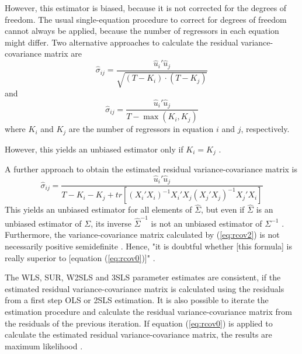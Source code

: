 \documentclass[article]{jss}
\begin{document}
However, this estimator is biased, because it is not corrected for the
degrees of freedom. 
The usual single-equation procedure to correct for degrees of freedom 
cannot always be applied, because the number of regressors in each equation 
might differ.
Two alternative approaches to calculate the residual variance-covariance 
matrix are
\begin{equation}
   \widehat{\sigma}_{ij} = \frac{ \widehat{u}_i' \widehat{u}_j }
   { \sqrt{ \left( T - K_i \right) \cdot \left( T - K_j \right) } }
   \label{eq:rcov1}
\end{equation}
and
\begin{equation}
   \widehat{\sigma}_{ij} = \frac{ \widehat{u}_i' \widehat{u}_j }
   { T - \max \left( K_i , K_j \right) }
\end{equation}
where $K_i$ and $K_j$ are the number of regressors in equation
$i$ and $j$, respectively.

However, this yields an unbiased estimator only if $K_i = K_j$ 
\citep[p. 469]{judge85}. 


A further approach to obtain the estimated residual variance-covariance
matrix is
\begin{equation}
   \widehat{\sigma}_{ij} = \frac{ \widehat{u}_i' \widehat{u}_j } 
   { T - K_i - K_j + tr \left[ \left( X_i' X_i \right)^{-1}
   X_i' X_j \left( X_j' X_j \right)^{-1} X_j' X_i \right] }
   \label{eq:rcov2}
\end{equation} 
This yields an unbiased estimator for all elements of $\widehat{\Sigma}$,
but even if $\widehat{\Sigma}$ is an unbiased estimator of $\Sigma$, 
its inverse $\widehat{\Sigma}^{-1}$ is not an unbiased estimator 
of $\Sigma^{-1}$ \citep[p.322]{theil71}.
Furthermore, the variance-covariance matrix calculated by (\ref{eq:rcov2})
is not necessarily positive semidefinite \citep[p.322]{theil71}. 
Hence, "it is doubtful whether [this formula] is really superior to 
[equation (\ref{eq:rcov0})]" \citep[p.322]{theil71}.


The WLS, SUR, W2SLS and 3SLS parameter estimates are consistent,
if the estimated residual variance-covariance matrix is calculated
using the residuals from a first step OLS or 2SLS estimation.
It is also possible to iterate the estimation procedure and 
calculate the residual variance-covariance matrix from the
residuals of the previous iteration. 
If equation (\ref{eq:rcov0}) is applied to calculate the estimated
residual variance-covariance matrix, the results are maximum
likelihood \citep[p. 345]{greene02}.
\end{document}
